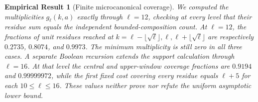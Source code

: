 \documentclass[11pt]{article}
\newtheorem{empirical}[theorem]{Empirical Result}
\theoremstyle{remark}
\begin{document}
\begin{empirical}[Finite microcanonical coverage]\label{thm:microcanonical-finite}
We computed the multiplicities $g_\ell(k,a)$ exactly through
$\ell=12$, checking at every level that their residue sum equals the
independent bounded-composition count. At $\ell=12$, the fractions of
unit residues reached at
$k=\ell-\lfloor\sqrt\ell\rfloor,\ell,
\ell+\lfloor\sqrt\ell\rfloor$ are respectively
$0.2735$, $0.8074$, and $0.9973$. The minimum multiplicity is still
zero in all three cases. A separate Boolean recursion extends the
support calculation through $\ell=16$. At that level the central and
upper-window coverage fractions are $0.9194$ and $0.99999972$, while
the first fixed cost covering every residue equals $\ell+5$ for each
$10\le\ell\le16$. These values neither prove nor refute the uniform
asymptotic lower bound.
\end{empirical}
\end{document}
